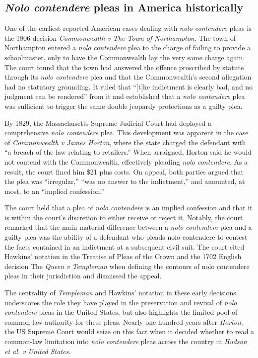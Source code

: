 \subsection{\textit{Nolo contendere} pleas in America historically}
One of the earliest reported American cases dealing with \textit{nolo contendere} pleas is the 1806 decision \textit{Commonwealth v The Town of Northampton}. The town of Northampton entered a \textit{nolo contendere} plea to the charge of failing to provide a schoolmaster, only to have the Commonwealth lay the very same charge again. The court found that the town had answered the offence proscribed by statute through its \textit{nolo contendere} plea and that the Commonwealth's second allegation had no statutory grounding. It ruled that ``[t]he indictment is clearly bad, and no judgment can be rendered'' from it and established that a \textit{nolo contendere} plea was sufficient to trigger the same double jeopardy protections as a guilty plea.

By 1829, the Massachusetts Supreme Judicial Court had deployed a comprehensive \textit{nolo contendere} plea. This development was apparent in the case of \textit{Commonwealth v James Horton}, where the state charged the defendant with ``a breach of the law relating to retailers.'' When arraigned, Horton said he would not contend with the Commonwealth, effectively pleading \textit{nolo contendere}. As a result, the court fined him \$21 plus costs. On appeal, both parties argued that the plea was ``irregular,'' ``was no answer to the indictment,'' and amounted, at most, to an ``implied confession.''

The court held that a plea of \textit{nolo contendere} is an implied confession and that it is within the court's discretion to either receive or reject it. Notably, the court remarked that the main material difference between a \textit{nolo contendere} plea and a guilty plea was the ability of a defendant who pleads nolo contendere to contest the facts contained in an indictment at a subsequent civil suit. The court cited Hawkins' notation in the Treatise of Pleas of the Crown and the 1702 English decision The \textit{Queen v Templeman} when defining the contours of nolo contendere pleas in their jurisdiction and dismissed the appeal.

The centrality of \textit{Templeman} and Hawkins' notation in these early decisions underscores the role they have played in the preservation and revival of \textit{nolo contendere} pleas in the United States, but also highlights the limited pool of common-law authority for these pleas. Nearly one hundred years after \textit{Horton}, the US Supreme Court would seize on this fact when it decided whether to read a common-law limitation into \textit{nolo contendere} pleas across the country in \textit{Hudson et al. v United States}.

